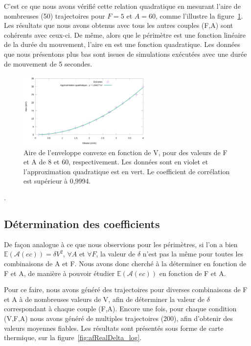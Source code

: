 	C'est ce que nous avons vérifié cette relation quadratique en mesurant l'aire de nombreuses (50) trajectoires pour $F = 5$ et $A = 60$, comme l'illustre la figure~\ref{fig:realAreaVspeed}. Les résultats que nous avons obtenus avec tous les autres couples (F,A) sont cohérents avec ceux-ci. De même, alors que le périmètre est une fonction linéaire de la durée du mouvement, l'aire en est une fonction quadratique. Les données que nous présentons plus bas sont issues de simulations exécutées avec une durée de mouvement de 5 secondes.

	\begin{figure}[!htbp]
		\centering
		\includegraphics[width=0.6\textwidth]{figures/ch4/realAreaVspeed}
		\caption[Aire de l'enveloppe convexe en fonction de V]{Aire de l'enveloppe convexe en fonction de V, pour des valeurs de F et A de 8 et 60, respectivement. Les données sont en violet et l'approximation quadratique est en vert. Le coefficient de corrélation est supérieur à 0,9994.}
		\label{fig:realAreaVspeed}
	\end{figure}. 
	
	\subsection{Détermination des coefficients}
	De façon analogue à ce que nous observions pour les périmètres, si l'on a bien $\mathbb{E}(\mathcal{A}(ec)) = \delta{}V^{2}$, $\forall A$ et $\forall F$, la valeur de $\delta$ n'est pas la même pour toutes les combinaisons de A et F. Nous avons donc cherché à la déterminer en fonction de F et A, de manière à pouvoir étudier $\mathbb{E}(\mathcal{A}(ec))$ en fonction de F et A.
	
	Pour ce faire, nous avons généré des trajectoires pour diverses combinaisons de F et A à de nombreuses valeurs de V, afin de déterminer la valeur de $\delta$ correspondant à chaque couple (F,A). Encore une fois, pour chaque condition (V,F,A) nous avons généré de multiples trajectoires (200), afin d'obtenir des valeurs moyennes fiables. Les résultats sont présentés sous forme de carte thermique, sur la figure~\ref{fig:afRealDelta_log}.
	
